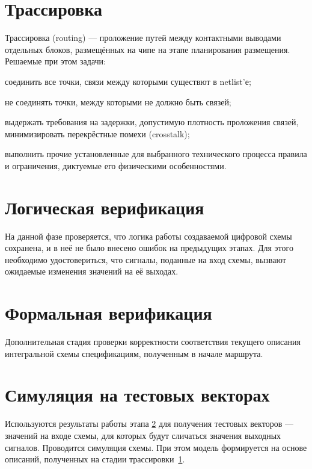 \section{Трассировка}\label{trace}

Трассировка (\abbr routing) — проложение путей между контактными выводами отдельных блоков, размещённых на чипе на этапе планирования размещения. Решаемые при этом задачи:
\begin{itemize*}
    \item соединить все точки, связи между которыми существют в netlist'е;
    \item не соединять точки, между которыми не должно быть связей;
    \item выдержать требования на задержки, допустимую плотность проложения связей, минимизировать перекрёстные помехи (\abbr crosstalk);
    \item выполнить прочие установленные для выбранного технического процесса правила и ограничения, диктуемые его физическими особенностями.
\end{itemize*}

\section{Логическая верификация}\label{logicverif}

На данной фазе проверяется, что логика работы создаваемой цифровой схемы сохранена, и в неё не было внесено ошибок на предыдущих этапах. Для этого необходимо удостовериться, что сигналы, поданные на вход схемы, вызвают ожидаемые изменения значений на её выходах.

\section{Формальная верификация}

Дополнительная стадия проверки корректности соответствия текущего описания интегральной схемы спецификациям, полученным в начале маршрута.


\section{Симуляция на тестовых векторах}

Используются результаты работы этапа \ref{logicverif} для получения тестовых векторов — значений на входе схемы, для которых будут сличаться значения выходных сигналов. Проводится симуляция схемы. При этом модель формируется на основе описаний, полученных на стадии трассировки~\ref{trace}.

